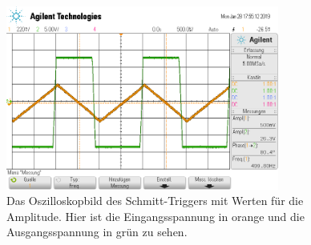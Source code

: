 \begin{figure}
  \centering
  \includegraphics[width=0.8\textwidth]{Schlager/scope_23.png}
  \caption{Das Oszilloskopbild des Schmitt-Triggers mit Werten für die Amplitude. Hier ist die Eingangsspannung in orange und die Ausgangsspannung in grün zu sehen.}
  \label{fig:schmitt2}
\end{figure}
